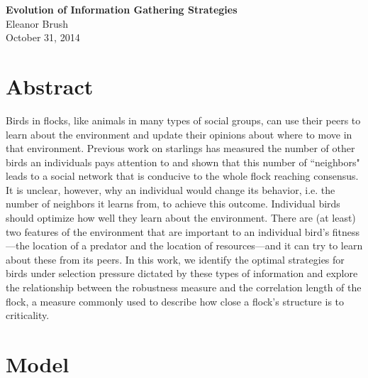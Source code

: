\documentclass{article}
\begin{document}
\begin{center}
{\bf \LARGE{Evolution of Information Gathering Strategies}}
\vspace{10pt}
\\ Eleanor Brush
\\ October 31, 2014
\end{center}

\tableofcontents

\section{Abstract}
Birds in flocks, like animals in many types of social groups, can use their peers to learn about the environment and update their opinions about where to move in that environment.  Previous work on starlings has measured the number of other birds an individuals pays attention to and shown that this number of ``neighbors" leads to a social network that is conducive to the whole flock reaching consensus.  It is unclear, however, why an individual would change its behavior, i.e. the number of neighbors it learns from, to achieve this outcome.  Individual birds should optimize how well they learn about the environment. There are (at least) two features of the environment that are important to an individual bird's fitness---the location of a predator and the location of resources---and it can try to learn about these from its peers. In this work, we identify the optimal strategies for birds under selection pressure dictated by these types of information and explore the relationship between the robustness measure and the correlation length of the flock, a measure commonly used to describe how close a flock's structure is to criticality.


\section{Model }
\end{document}
